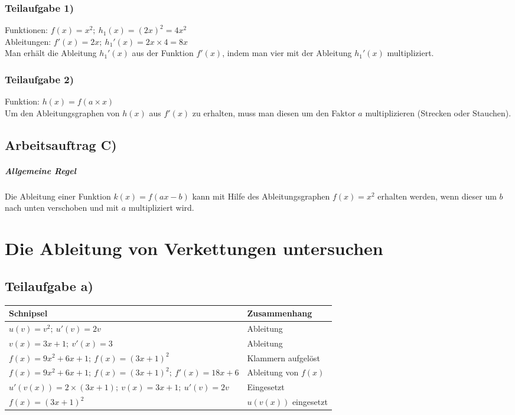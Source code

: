 \documentclass[11pt, a4paper]{report}
\begin{document}
	\subsection{Teilaufgabe 1)}
	Funktionen: $f(x) = x^2;\  h_1(x) = (2x)^2 = 4x^2$ \\
	Ableitungen: $f'(x) = 2x;\ h_1'(x) = 2x \times 4 = 8x$ \\
	Man erhält die Ableitung $h_1'(x)$ aus der Funktion $f'(x)$, indem man vier mit der Ableitung $h_1'(x)$ multipliziert.
	\subsection{Teilaufgabe 2)}
	Funktion: $h(x) = f(a \times x)$ \\
	Um den Ableitungsgraphen von $h(x)$ aus $f'(x)$ zu erhalten, muss man diesen um den Faktor $a$ multiplizieren (Strecken oder Stauchen).
	\section{Arbeitsauftrag C)}
	\paragraph{Allgemeine Regel} Die Ableitung einer Funktion $k(x) = f(ax - b)$ kann mit Hilfe des Ableitungsgraphen $f(x) = x^2$ erhalten werden, wenn dieser um $b$ nach unten verschoben und mit $a$ multipliziert wird.
	\chapter{Die Ableitung von Verkettungen untersuchen}
	\section{Teilaufgabe a)}
	\begin{tabularx}{\textwidth}{|X|X|}
	\hline
	\textbf{Schnipsel} & \textbf{Zusammenhang} \\
	\hline
	$u(v) = v^2;\ u'(v) = 2v$ & Ableitung \\
	\hline
	$v(x) = 3x + 1;\ v'(x) = 3$ & Ableitung \\
	\hline
	$f(x) = 9x^2 + 6x + 1;\ f(x) = (3x + 1)^2$ & Klammern aufgelöst \\
	\hline
	$f(x) = 9x^2 + 6x + 1;\ f(x) = (3x + 1)^2;\ f'(x) = 18x + 6$ & Ableitung von $f(x)$ \\
	\hline
	$u'(v(x)) = 2\times(3x + 1);\ v(x) = 3x + 1;\ u'(v) = 2v $ & Eingesetzt\\
	\hline
	$f(x) = (3x + 1)^2$ & $u(v(x))$ eingesetzt \\
	\hline
	\end{tabularx}
\end{document}
